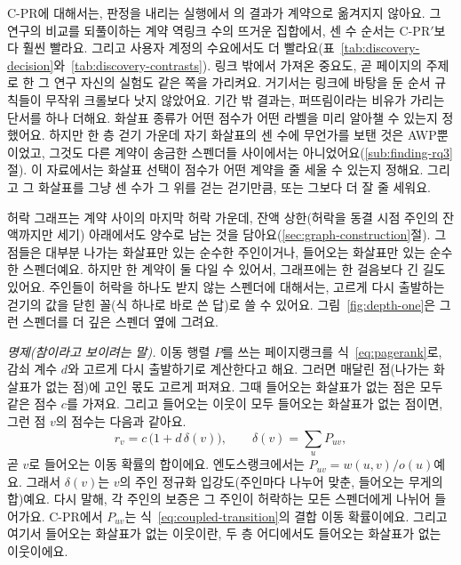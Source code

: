\mbox{C-PR}에 대해서는, 판정을 내리는 실행에서 \textcite{cho1998crawling}의 결과가 계약으로 옮겨지지 않아요. 그 연구의 비교를 되풀이하는 계약 역링크 수의 뜨거운 집합에서, 센 수 순서는 \mbox{C-PR}$'$보다 훨씬 빨라요. 그리고 사용자 계정의 수요에서도 더 빨라요(표~\ref{tab:discovery-decision}와~\ref{tab:discovery-contrasts}). 링크 밖에서 가져온 중요도, 곧 페이지의 주제로 한 그 연구 자신의 실험도 같은 쪽을 가리켜요. 거기서는 링크에 바탕을 둔 순서 규칙들이 무작위 크롤보다 낫지 않았어요. 기간 밖 결과는, 퍼뜨림이라는 비유가 가리는 단서를 하나 더해요. 화살표 종류가 어떤 점수가 어떤 라벨을 미리 알아챌 수 있는지 정했어요. 하지만 한 층 걷기 가운데 자기 화살표의 센 수에 무언가를 보탠 것은 AWP뿐이었고, 그것도 다른 계약이 송금한 스펜더들 사이에서는 아니었어요(\ref{sub:finding-rq3}절). 이 자료에서는 화살표 선택이 점수가 어떤 계약을 줄 세울 수 있는지 정해요. 그리고 그 화살표를 그냥 센 수가 그 위를 걷는 걷기만큼, 또는 그보다 더 잘 줄 세워요.


허락 그래프는 계약 사이의 마지막 허락 가운데, 잔액 상한(허락을 동결 시점 주인의 잔액까지만 세기) 아래에서도 양수로 남는 것을 담아요(\ref{sec:graph-construction}절). 그 점들은 대부분 나가는 화살표만 있는 순수한 주인이거나, 들어오는 화살표만 있는 순수한 스펜더예요. 하지만 한 계약이 둘 다일 수 있어서, 그래프에는 한 걸음보다 긴 길도 있어요. 주인들이 허락을 하나도 받지 않는 스펜더에 대해서는, 고르게 다시 출발하는 걷기의 값을 닫힌 꼴(식 하나로 바로 쓴 답)로 쓸 수 있어요. 그림~\ref{fig:depth-one}은 그런 스펜더를 더 깊은 스펜더 옆에 그려요.

\emph{명제(참이라고 보이려는 말).} 이동 행렬 $P$를 쓰는 페이지랭크를 식~\eqref{eq:pagerank}로, 감쇠 계수 $d$와 고르게 다시 출발하기로 계산한다고 해요. 그러면 매달린 점(나가는 화살표가 없는 점)에 고인 몫도 고르게 퍼져요. 그때 들어오는 화살표가 없는 점은 모두 같은 점수 $c$를 가져요. 그리고 들어오는 이웃이 모두 들어오는 화살표가 없는 점이면, 그런 점 $v$의 점수는 다음과 같아요.
\begin{equation}
\label{eq:closed-form}
r_v = c\,\bigl(1 + d\,\delta(v)\bigr), \qquad \delta(v)=\sum_{u} P_{uv},
\end{equation}
곧 $v$로 들어오는 이동 확률의 합이에요. 엔도스랭크에서는 $P_{uv}=w(u,v)/o(u)$예요. 그래서 $\delta(v)$는 $v$의 주인 정규화 입강도(주인마다 나누어 맞춘, 들어오는 무게의 합)예요. 다시 말해, 각 주인의 보증은 그 주인이 허락하는 모든 스펜더에게 나뉘어 들어가요. \mbox{C-PR}에서 $P_{uv}$는 식~\eqref{eq:coupled-transition}의 결합 이동 확률이에요. 그리고 여기서 들어오는 화살표가 없는 이웃이란, 두 층 어디에서도 들어오는 화살표가 없는 이웃이에요.

